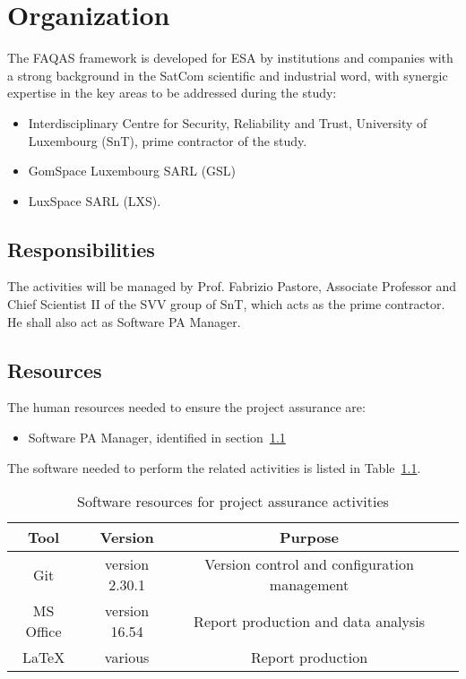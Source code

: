 \chapter{Organization}
\label{chapter:organization}


The FAQAS framework is developed for ESA by institutions and companies with a strong background in the SatCom
scientific and industrial word, with synergic expertise in the key areas to be addressed during
the study:
\begin{itemize}
  \item Interdisciplinary Centre for Security, Reliability and Trust, University of Luxembourg (SnT), prime contractor of the study.
  \item GomSpace Luxembourg SARL (GSL)
  \item LuxSpace SARL (LXS).
\end{itemize}

\section{Responsibilities}
\label{sec:resp}

The activities will be managed by Prof. Fabrizio Pastore, Associate Professor and Chief Scientist II of the SVV group of SnT, which acts as the prime contractor.
He shall also act as Software PA Manager.

\section{Resources}
\label{sec:resources}

The human resources needed to ensure the project assurance are:
\begin{itemize}
  \item Software PA Manager, identified in section~\ref{sec:resp}%
\end{itemize}

The software needed to perform the related activities is listed in Table~\ref{table:software_resources}.

\begin{table}[H]
\centering
\begin{tabular}{||c|c|c|c||}
 \hline
 \textbf{Tool} & \textbf{Version} & \textbf{Purpose}\\
 \hline
 Git & version 2.30.1 & Version control and configuration management \\
 MS Office & version 16.54 & Report production and data analysis \\
 LaTeX & various & Report production \\
 \hline
\end{tabular}
\caption{Software resources for project assurance activities}
\label{table:software_resources}
\end{table}

